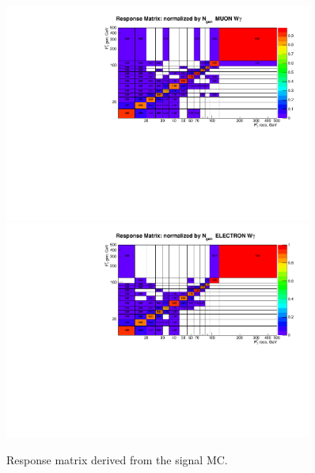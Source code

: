 \begin{figure}[htb]
  \begin{center}
   \includegraphics[width=0.90\textwidth]{../figs/figs_v11/MUON_WGamma/Constants/cResponseMatr_MUON_WGamma__yield_pm_stat.pdf}\\
\includegraphics[width=0.90\textwidth]{../figs/figs_v11/ELECTRON_WGamma/Constants/cResponseMatr_ELECTRON_WGamma__yield_pm_stat.pdf}
  \caption{Response matrix derived from the signal MC.}
  \label{fig:respMatrices_Wg}
  \end{center}
\end{figure}

